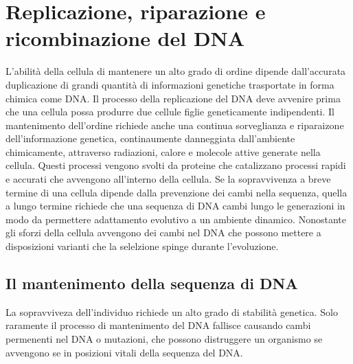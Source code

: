 \chapter{Replicazione, riparazione e ricombinazione del DNA}
L'abilit\`a della cellula di mantenere un alto grado di ordine dipende dall'accurata duplicazione di grandi quantit\`a di informazioni genetiche trasportate in forma chimica come DNA.
Il processo della replicazione del DNA deve avvenire prima che una cellula possa produrre due cellule figlie geneticamente indipendenti. Il mantenimento dell'ordine richiede anche una
continua sorveglianza e riparaizone dell'informazione genetica, continaumente danneggiata dall'ambiente chimicamente, attraverso radiazioni, calore e molecole attive generate nella 
cellula. Questi processi vengono svolti da proteine che catalizzano processi rapidi e accurati che avvengono all'interno della cellula. Se la sopravvivenza a breve termine di una cellula
dipende dalla prevenzione dei cambi nella sequenza, quella a lungo termine richiede che una sequenza di DNA cambi lungo le generazioni in modo da permettere adattamento evolutivo a un
ambiente dinamico. Nonostante gli sforzi della cellula avvengono dei cambi nel DNA che possono mettere a disposizioni varianti che la selelzione spinge durante l'evoluzione.
\section{Il mantenimento della sequenza di DNA}
La sopravviveza dell'individuo richiede un alto grado di stabilit\`a genetica. Solo raramente il processo di mantenimento del DNA fallisce causando cambi permenenti nel DNA o mutazioni, 
che possono distruggere un organismo se avvengono se in posizioni vitali della sequenza del DNA.
